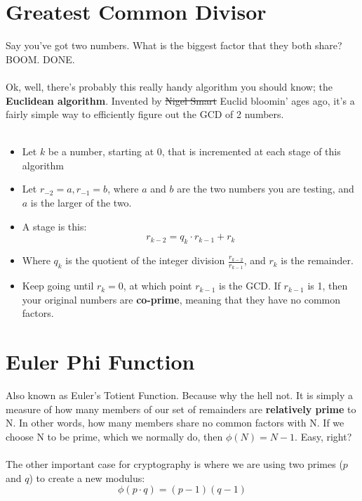     \section{Greatest Common Divisor}
    Say you've got two numbers. What is the biggest factor that they both share? BOOM. DONE.\\
    \\
    Ok, well, there's probably this really handy algorithm you should know; the \textbf{Euclidean algorithm}. Invented by \sout{Nigel Smart} Euclid bloomin' ages ago, it's a fairly simple way to efficiently figure out the GCD of 2 numbers.\\
    \\
        \begin{itemize}
            \item Let $k$ be a number, starting at 0, that is incremented at each stage of this algorithm
            \item Let $r_{-2} = a, r_{-1} = b$, where $a$ and $b$ are the two numbers you are testing, and $a$ is the larger of the two.
            \item A stage is this: 
                $$
                    r_{k-2} = q_{k} \cdot r_{k-1} + r_{k}
                $$
            \item Where $q_{k}$ is the quotient of the integer division $\frac{r_{k-2}}{r_{k-1}}$, and $r_{k}$ is the remainder.
            \item Keep going until $r_{k} = 0$, at which point $r_{k-1}$ is the GCD. If $r_{k-1}$ is 1, then your original numbers are \textbf{co-prime}, meaning that they have no common factors.
        \end{itemize}
    
    \section{Euler Phi Function}
    Also known as Euler's Totient Function. Because why the hell not. It is simply a measure of how many members of our set of remainders are \textbf{relatively prime} to N. In other words, how many members share no common factors with N. If we choose N to be prime, which we normally do, then $\phi(N) = N - 1$. Easy, right?\\
    \\
    The other important case for cryptography is where we are using two primes ($p$ and $q$) to create a new modulus:\\
    $$ \phi(p \cdot q) = (p-1)(q-1)$$\\

